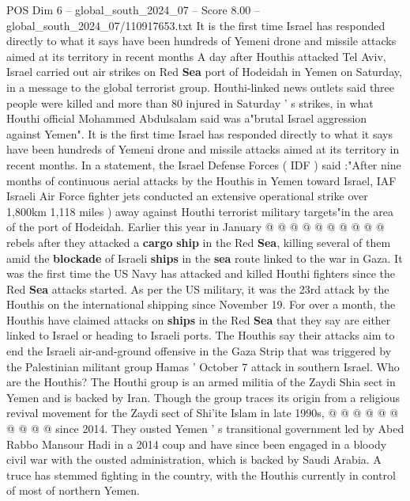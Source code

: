 \begin{textsample}{POS Dim 6 – global\_south\_2024\_07 – Score 8.00 – global\_south\_2024\_07/110917653.txt}  \label{ex:f6_pos_311}
It is the first time Israel has responded directly to what it says have been hundreds of Yemeni drone and missile attacks aimed at its territory in recent months A day after Houthis attacked Tel Aviv, Israel carried out air strikes on Red \textbf{Sea} port of Hodeidah in Yemen on Saturday, in a message to the global terrorist group.
Houthi-linked news outlets said three people were killed and more than 80 injured in Saturday ' s strikes, in what Houthi official Mohammed Abdulsalam said was a"brutal Israel aggression against Yemen".
It is the first time Israel has responded directly to what it says have been hundreds of Yemeni drone and missile attacks aimed at its territory in recent months.
In a statement, the Israel Defense Forces ( IDF ) said :"After nine months of continuous aerial attacks by the Houthis in Yemen toward Israel, IAF Israeli Air Force fighter jets conducted an extensive operational strike over 1,800km 1,118 miles ) away against Houthi terrorist military targets"in the area of the port of Hodeidah.
Earlier this year in January @ @ @ @ @ @ @ @ @ @ rebels after they attacked a \textbf{cargo} \textbf{ship} in the Red \textbf{Sea}, killing several of them amid the \textbf{blockade} of Israeli \textbf{ships} in the \textbf{sea} route linked to the war in Gaza.
It was the first time the US Navy has attacked and killed Houthi fighters since the Red \textbf{Sea} attacks started.
As per the US military, it was the 23rd attack by the Houthis on the international shipping since November 19.
For over a month, the Houthis have claimed attacks on \textbf{ships} in the Red \textbf{Sea} that they say are either linked to Israel or heading to Israeli ports.
The Houthis say their attacks aim to end the Israeli air-and-ground offensive in the Gaza Strip that was triggered by the Palestinian militant group Hamas ' October 7 attack in southern Israel.
Who are the Houthis?
The Houthi group is an armed militia of the Zaydi Shia sect in Yemen and is backed by Iran.
Though the group traces its origin from a religious revival movement for the Zaydi sect of Shi'ite Islam in late 1990s, @ @ @ @ @ @ @ @ @ @ since 2014.
They ousted Yemen ' s transitional government led by Abed Rabbo Mansour Hadi in a 2014 coup and have since been engaged in a bloody civil war with the ousted administration, which is backed by Saudi Arabia.
A truce has stemmed fighting in the country, with the Houthis currently in control of most of northern Yemen.

\end{textsample}
